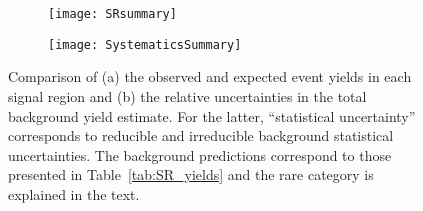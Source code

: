 \begin{figure}[htb!]
\begin{center}
\begin{subfigure}[t]{0.98\textwidth}\texttt{[image: SRsummary]}\caption{}\label{fig:Results_SRSum}\end{subfigure}
\begin{subfigure}[t]{1.08\textwidth}\texttt{[image: SystematicsSummary]}\caption{}\label{fig:Results_SystSum}\end{subfigure}
\end{center}
\caption{Comparison of (a) the observed and expected event yields in each signal region and (b) the relative uncertainties in the total 
background yield estimate. For the latter, ``statistical uncertainty'' corresponds to reducible and irreducible background 
statistical uncertainties. The background predictions correspond to those presented in Table~\ref{tab:SR_yields} and the 
rare category is explained in the text. } 
\label{fig:PlotSR}
\end{figure}


